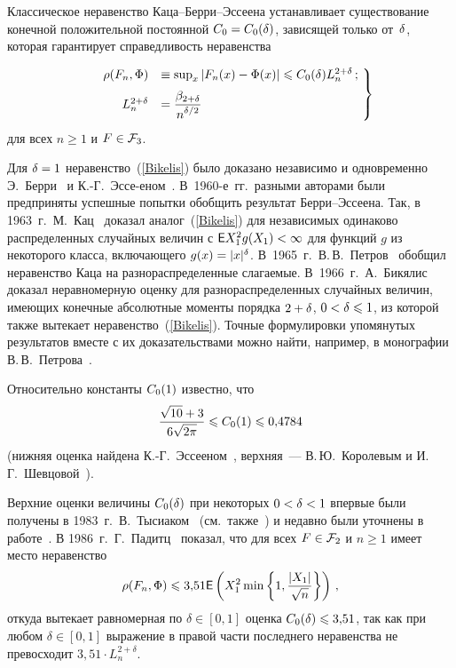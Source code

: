 \begin{multicols}{2}
Классическое неравенство Каца--Берри--Эс\-се\-ена устанавливает
существование конечной положительной постоянной $C_0=C_0(\delta)$,
зависящей только от~$\delta$, которая гарантирует справедливость
неравенства

\noindent
\begin{equation}
\!\left.
\begin{array}{rl}
\rho(F_n,\Phi) &\equiv\sup_x|F_n(x)-\Phi(x)|\leqslant C_0(\delta)
L_n^{2+\delta}\,;\\[6pt]
 L_n^{2+\delta}&=\displaystyle\frac{\displaystyle \beta_{2+\delta}\mathstrut}{\displaystyle n^{\delta/2}\mathstrut}
 \end{array}\!
 \right \}\!\!\!\!\!
\label{Bikelis}
\end{equation}
для всех $n\ge1$ и $F\in{\mathcal F}_3$. 

Для  $\delta=1$
неравенство~(\ref{Bikelis}) было доказано независимо и одновременно
Э.~Берри~\cite{Berry1941} и К.-Г.~Эссе-\linebreak еном~\cite{Esseen1942}. В~1960-е~гг.\
разными авторами были предприняты успешные попытки обобщить\linebreak
результат Берри--Эссеена. Так, в 1963~г.\ М.~Кац~\cite{Katz1963}
доказал аналог~(\ref{Bikelis}) для независимых одинаково
распределенных случайных величин с ${\sf E} X_1^2g(X_1)<\infty$ для
функций $g$ из некоторого класса, включающего $g(x)=|x|^\delta$. 
В~1965~г.\ В.\,В.~Пет\-ров~\cite{Petrov1965} обобщил неравенство Каца
на разнораспределенные слагаемые. В~1966~г.\
А.~Бикялис~\cite{Bikelis1966} доказал неравномерную оценку для
разнораспределенных случайных величин, имеющих конечные абсолютные
моменты порядка $2+\delta$, $0<\delta\leqslant1$, из которой также вытекает
неравенство~(\ref{Bikelis}). Точные формулировки  упомянутых
результатов вместе с их доказательствами можно найти, например, в
монографии В.\,В.~Петрова~\cite{Petrov1972}.

Относительно константы $C_0(1)$ известно, что
$$
\displaystyle\frac{\displaystyle \sqrt{10}+3\mathstrut}{\displaystyle 6\sqrt{2\pi}\mathstrut}\leqslant C_0(1)\leqslant 0{,}4784
$$
(нижняя оценка найдена К.-Г.~Эссееном~\cite{Esseen1956}, верхняя~--- В.\,Ю.~Королевым и 
И.\,Г.~Шевцовой~\cite{KorolevShevtsova2010}).

Верхние оценки величины $C_0(\delta)$ при некоторых $0<\delta<1$ впервые
были получены в 1983~г.\ В.~Тысиаком~\cite{Tysiak1983} 
(см.\ также~\cite{Paditz1996}) и недавно были уточнены в 
работе~\cite{GaponovaKorchaginShevtsova2009}. В 1986~г.\
Г.~Падитц~\cite{Paditz1986} показал, что для всех $F\in{\mathcal F}_2$ и
$n\ge1$ имеет место неравенство
$$
\rho(F_n,\Phi)\leqslant 3{,}51{{\sf E}}\left(X_1^2\min\left\{1,
\displaystyle\frac{\displaystyle |X_1|\mathstrut}{\displaystyle \sqrt{n}\mathstrut}\right\}\right)\,,
$$
откуда вытекает равномерная по $\delta\in[0,1]$ оценка
$C_0(\delta)\leqslant 3{,}51$, так как при любом $\delta\in[0,1]$ выражение
в правой части последнего неравенства не превосходит $3{,}51\cdot
L_n^{2+\delta}$.


\end{multicols}
